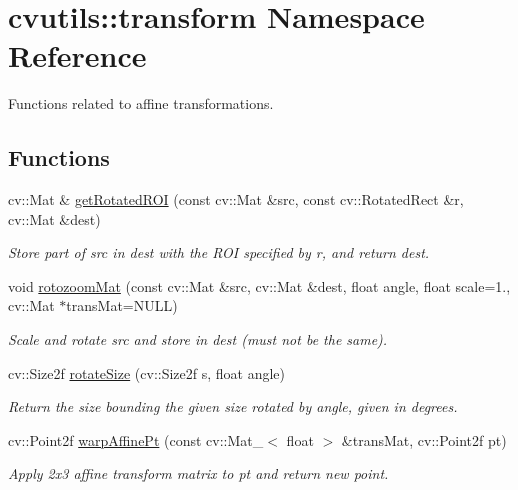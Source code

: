 \hypertarget{namespacecvutils_1_1transform}{\section{cvutils\-:\-:transform Namespace Reference}
\label{namespacecvutils_1_1transform}
}


Functions related to affine transformations.  


\subsection*{Functions}
\begin{DoxyCompactItemize}
\item 
cv\-::\-Mat \& \hyperlink{namespacecvutils_1_1transform_a74e90c5a7806491a108fad30703cae2c}{get\-Rotated\-R\-O\-I} (const cv\-::\-Mat \&src, const cv\-::\-Rotated\-Rect \&r, cv\-::\-Mat \&dest)
\begin{DoxyCompactList}\small\item\em Store part of {\ttfamily src} in {\ttfamily dest} with the R\-O\-I specified by {\ttfamily r}, and return {\ttfamily dest}. \end{DoxyCompactList}\item 
void \hyperlink{namespacecvutils_1_1transform_ac254c72298a9cd69aac2bde803739757}{rotozoom\-Mat} (const cv\-::\-Mat \&src, cv\-::\-Mat \&dest, float angle, float scale=1., cv\-::\-Mat $\ast$trans\-Mat=N\-U\-L\-L)
\begin{DoxyCompactList}\small\item\em Scale and rotate {\ttfamily src} and store in {\ttfamily dest} (must not be the same). \end{DoxyCompactList}\item 
cv\-::\-Size2f \hyperlink{namespacecvutils_1_1transform_a4ba17f552aeae6ddce6ca2da28936f42}{rotate\-Size} (cv\-::\-Size2f s, float angle)
\begin{DoxyCompactList}\small\item\em Return the size bounding the given size rotated by {\ttfamily angle}, given in degrees. \end{DoxyCompactList}\item 
cv\-::\-Point2f \hyperlink{namespacecvutils_1_1transform_a0b54497d842a62c5f538004ac93ba5ff}{warp\-Affine\-Pt} (const cv\-::\-Mat\-\_\-$<$ float $>$ \&trans\-Mat, cv\-::\-Point2f pt)
\begin{DoxyCompactList}\small\item\em Apply 2x3 affine transform matrix to {\ttfamily pt} and return new point. \end{DoxyCompactList}\end{DoxyCompactItemize}


